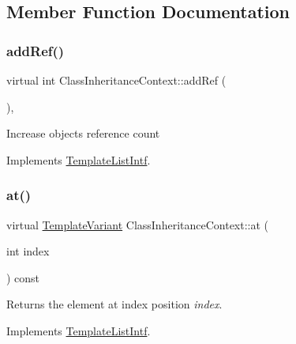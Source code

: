 \subsection{Member Function Documentation}
\mbox{\label{class_class_inheritance_context_add3dd0b40d3bed1b4e48899991dbaf84}} 
\subsubsection{\texorpdfstring{addRef()}{addRef()}}
{\footnotesize\ttfamily virtual int Class\+Inheritance\+Context\+::add\+Ref (\begin{DoxyParamCaption}{ }\end{DoxyParamCaption})\hspace{0.3cm}{\ttfamily [inline]}, {\ttfamily [virtual]}}

Increase object\textquotesingle{}s reference count 

Implements \mbox{\hyperlink{class_template_list_intf_a4b4973e2e15396d10bc4e3085462ca2b}{Template\+List\+Intf}}.

\mbox{\label{class_class_inheritance_context_ad824ec079b4dc94d2b5b3e6a0e60984a}} 
\subsubsection{\texorpdfstring{at()}{at()}}
{\footnotesize\ttfamily virtual \mbox{\hyperlink{class_template_variant}{Template\+Variant}} Class\+Inheritance\+Context\+::at (\begin{DoxyParamCaption}\item[{int}]{index }\end{DoxyParamCaption}) const\hspace{0.3cm}{\ttfamily [virtual]}}

Returns the element at index position {\itshape index}. 

Implements \mbox{\hyperlink{class_template_list_intf_aa51e57e72eacf4e8ce1055ee30a0f7f8}{Template\+List\+Intf}}.

\mbox{\label{class_class_inheritance_context_a8fa0bcb90c0640638cd4168e91696a16}} 
